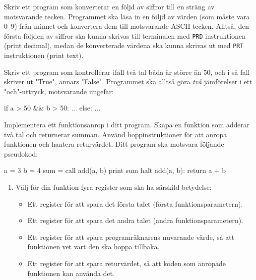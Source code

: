 \begin{Extrauppgifter}
    \item {} Skriv ett program som konverterar en följd av siffror till en sträng av motsvarande tecken. Programmet ska läsa in en följd av värden (som måste vara 0--9) från minnet och konvertera dem till motsvarande ASCII tecken. Alltså, den första följden av siffror ska kunna skrivas till terminalen med \texttt{PRD} instruktionen (print decimal), medan de konverterade värdena ska kunna skrivas ut med \texttt{PRT} instruktionen (print text).

    \item {}Skriv ett program som kontrollerar ifall två tal båda är större än 50, och i så fall skriver ut "True", annars "False". Programmet ska alltså göra \emph{två} jämförelser i ett "och"-uttryck, motsvarande ungefär:
    \begin{Code}
        if a > 50 && b > 50:
            ...
        else:
            ...
    \end{Code}
    \vspace{-3mm}

    \item {} Implementera ett funktionsanrop i ditt program. Skapa en funktion som adderar två tal och returnerar summan. Använd hoppinstruktioner för att anropa funktionen och hantera returvärdet. Ditt program ska motsvara följande pseudokod:
    \begin{Code}
        a = 3
        b = 4
        sum = call add(a, b)
        print sum
        halt
        add(a, b):
            return a + b
    \end{Code}
    \vspace{-3mm}
    \begin{enumerate}
        \item Välj för din funktion fyra register som ska ha särskild betydelse:
              \begin{itemize}
                  \item Ett register för att spara det första talet (första funktionsparametern).
                  \item Ett register för att spara det andra talet (andra funktionsparametern).
                  \item Ett register för att spara programräknarens nuvarande värde, så att funktionen vet vart den ska hoppa tillbaka.
                  \item Ett register för att spara returvärdet, så att koden som anropade funktionen kan använda det.
              \end{itemize}


\end{enumerate}
\end{Extrauppgifter}
